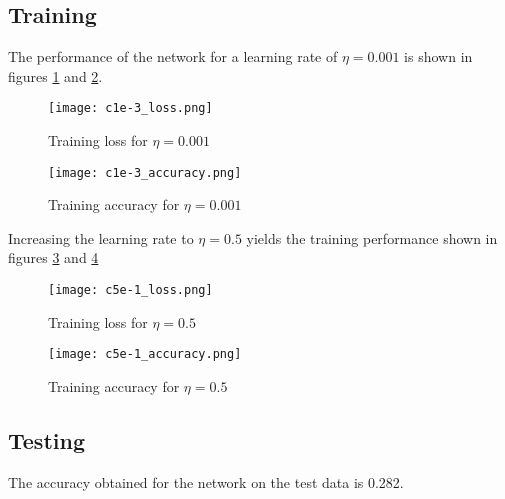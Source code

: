 \documentclass{article}
\begin{document}
\subsection{Training}
The performance of the network for a learning rate of $\eta = 0.001$ is shown in figures
\ref{fig:cifar_three_loss} and \ref{fig:cifar_three_accuracy}.

\begin{figure}[!ht]
  \texttt{[image: c1e-3\_loss.png]}
  \caption{Training loss for $\eta = 0.001$}
  \label{fig:cifar_three_loss}
\end{figure}

\begin{figure}[!ht]
  \texttt{[image: c1e-3\_accuracy.png]}
  \caption{Training accuracy for $\eta = 0.001$}
  \label{fig:cifar_three_accuracy}
\end{figure}

Increasing the learning rate to $\eta = 0.5$ yields the training performance shown in figures
\ref{fig:cifar_one_loss} and \ref{fig:cifar_one_accuracy}

\begin{figure}[!ht]
  \texttt{[image: c5e-1\_loss.png]}
  \caption{Training loss for $\eta = 0.5$}
  \label{fig:cifar_one_loss}
\end{figure}

\begin{figure}[!ht]
  \texttt{[image: c5e-1\_accuracy.png]}
  \caption{Training accuracy for $\eta = 0.5$}
  \label{fig:cifar_one_accuracy}
\end{figure}

\subsection{Testing}
The accuracy obtained for the network on the test data is 0.282.
\end{document}
